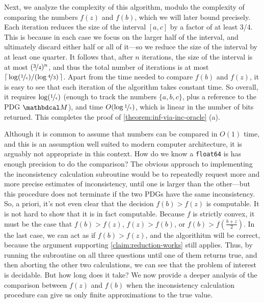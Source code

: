 \begin{lproof}
Next, we analyze the complexity of this algorithm, modulo the
    complexity of comparing the numbers $f(z)$ and $f(b)$, which
    we will later bound precisely.
    Each iteration reduces the size of the interval $[a,c]$
        by a factor of at least 3/4.
    This is because in each case we focus on the larger half of the interval,
        and ultimately discard either half or all of it---so
        we reduce the size of the interval by at least one quarter.
    It follows that, after $n$ iterations,
        the size of the interval is at most $(\nicefrac34)^n$,
    and thus the total number of iterations is at most $\lceil\, \log(\nicefrac{1}{\epsilon}) / (\log \nicefrac43)\,\rceil$.
    Apart from the time needed to compare $f(b)$ and $f(z)$,
    it is easy to see that each iteration of the algorithm takes constant time.
    So overall, it requires
    $\log(\nicefrac1\epsilon)$ (enough to track the numbers $\{a,b,c\}$, plus a reference to the PDG $\dg M$), and time $O(\log \nicefrac1\epsilon)$, which is linear in the number of bits returned.
    This completes the proof of \cref{theorem:inf-via-inc-oracle} (a). 

    Although it is common to assume that numbers can be compared in $O(1)$ time, and this is an assumption well suited to modern computer architecture, it is arguably not appropriate in this context.
    How do we know a \texttt{float64} is has enough precision to do the comparison? 
The obvious approach to implementing the inconsistency calculation subroutine
    would be to repeatedly request more and more precise estimates of inconsistency,
    until one is larger than the other---but this procedure does not terminate if the two PDGs have the same inconsistency. 
    So, a priori, it's not even clear that the decision $f(b) > f(z)$
    is computable.
    It is not hard to show that it is in fact computable.
    Because $f$ is strictly convex,
    it must be the case that $f(b) > f(z)$, $f(z) > f(b)$, or
            $f(b) > f(\frac{b+z}{2})$.  
    In the last case, we can act as if $f(b) > f(z)$, and 
    the algorithitm will be correct, because
    the argument supporting \cref{claim:reduction-works} still applies.
    Thus, by running the subroutine on all three questions until one of them
        returns true, and then aborting the other two calculations, we can see that
        the problem of interest is decidable.
    But how long does it take?
    We now provide a deeper analysis of the comparison between $f(z)$ and $f(b)$
    when the inconsistency calculation procedure can give us only finite approximations to the true value. 


\end{lproof}
